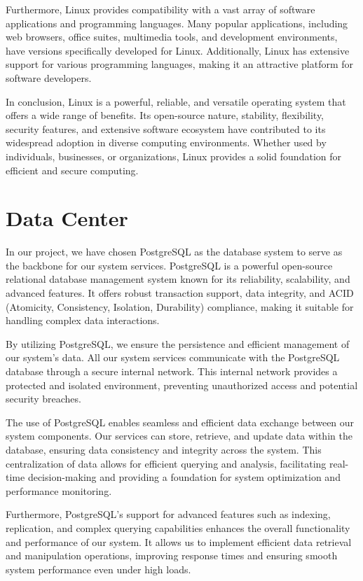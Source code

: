 \documentclass[
12pt,
oneside, 
onehalfspacing, 
nolistspacing, 
parskip, 
chapterinoneline, 
]{AASTCOMPUTER}
\begin{document}
Furthermore, Linux provides compatibility with a vast array of software applications and programming languages. Many popular applications, including web browsers, office suites, multimedia tools, and development environments, have versions specifically developed for Linux. Additionally, Linux has extensive support for various programming languages, making it an attractive platform for software developers.

In conclusion, Linux is a powerful, reliable, and versatile operating system that offers a wide range of benefits. Its open-source nature, stability, flexibility, security features, and extensive software ecosystem have contributed to its widespread adoption in diverse computing environments. Whether used by individuals, businesses, or organizations, Linux provides a solid foundation for efficient and secure computing.
\section{Data Center}
In our project, we have chosen PostgreSQL as the database system to serve as the backbone for our system services. PostgreSQL is a powerful open-source relational database management system known for its reliability, scalability, and advanced features. It offers robust transaction support, data integrity, and ACID (Atomicity, Consistency, Isolation, Durability) compliance, making it suitable for handling complex data interactions.

By utilizing PostgreSQL, we ensure the persistence and efficient management of our system's data. All our system services communicate with the PostgreSQL database through a secure internal network. This internal network provides a protected and isolated environment, preventing unauthorized access and potential security breaches.

The use of PostgreSQL enables seamless and efficient data exchange between our system components. Our services can store, retrieve, and update data within the database, ensuring data consistency and integrity across the system. This centralization of data allows for efficient querying and analysis, facilitating real-time decision-making and providing a foundation for system optimization and performance monitoring.

Furthermore, PostgreSQL's support for advanced features such as indexing, replication, and complex querying capabilities enhances the overall functionality and performance of our system. It allows us to implement efficient data retrieval and manipulation operations, improving response times and ensuring smooth system performance even under high loads.
\end{document}
